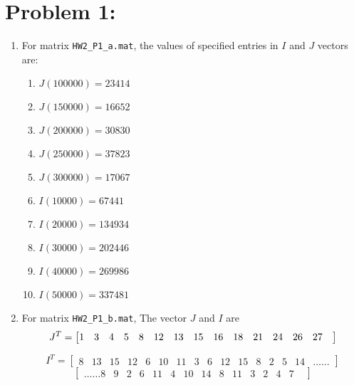 \section*{Problem 1:}
\begin{enumerate}
\item For matrix \texttt{HW2\_P1\_a.mat}, the values of specified entries in $I$ and $J$ vectors are: 
\begin{enumerate}
\item $J(100000)= 23414$
\item $J(150000)= 16652$
\item $J(200000)= 30830$
\item $J(250000)= 37823$
\item $J(300000)= 17067$
\item $I(10000)= 67441$
\item $I(20000)= 134934$
\item $I(30000)= 202446$
\item $I(40000)= 269986$
\item $I(50000)= 337481$
\end{enumerate}


\item  For matrix \texttt{HW2\_P1\_b.mat}, The vector $J$ and $I$ are 
$$
\setcounter{MaxMatrixCols}{50}
J^{T} = 
\begin{bmatrix}
 1&
 3&
 4&
 5&
 8&
12&
13&
15&
16&
18&
21&
24&
26&
27&
\end{bmatrix}
$$

$$
I^{T} = 
\begin{bmatrix}
 8&
13&
15&
12&
 6&
10&
11&
 3&
 6&
12&
15&
 8&
 2&
 5&
14&
\dots\dots
\end{bmatrix}
$$
$$
\begin{bmatrix}
\dots\dots
 8&
 9&
 2&
 6&
11&
 4&
10&
14&
 8&
11&
 3&
 2&
 4&
 7&
\end{bmatrix}
$$


\end{enumerate}